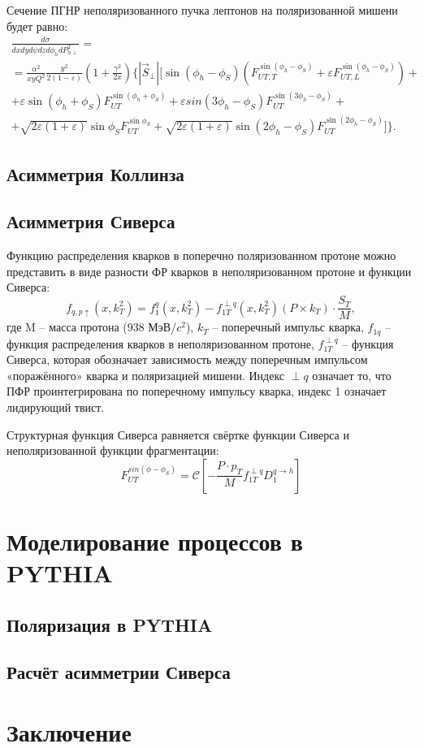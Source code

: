 \documentclass{extarticle}
\begin{document}
Сечение ПГНР неполяризованного пучка лептонов на поляризованной мишени будет равно:
\begin{multline}
	\frac{d\sigma}{dx dy d \psi dz d \phi_{h} dP^{2}_{h \perp}} = \\
	= \frac{\alpha^2}{xy Q^{2}} \frac{y^2}{2 (1 - \varepsilon)} \left(1 + \frac{\gamma^2}{2x} \right) \Biggl \lbrace 	
	 |\vec S_{\perp}| \Biggl[ \sin(\phi_h - \phi_S) \left(F_{U T, T}^{\sin(\phi_h - \phi_S)} +
	\varepsilon F_{UT, L}^{\sin(\phi_h - \phi_S)} \right) + \\
	+ \varepsilon \sin(\phi_h + \phi_S) F_{U T}^{\sin (\phi_h + \phi_S)} +
	\varepsilon sin (3\phi_h - \phi_S) F_{UT}^{\sin (3\phi_h - \phi_S)} + \\
	+ \sqrt{2 \varepsilon (1 + \varepsilon)} \sin \phi_S F_{UT}^{\sin \phi_S} +
	\sqrt{2 \varepsilon (1 + \varepsilon)} \sin(2\phi_h - \phi_S) F_{UT}^{\sin(2\phi_h - \phi_S)}  \Biggr]\Biggr \rbrace.
\end{multline}
\subsection{Асимметрия Коллинза}
\subsection{Асимметрия Сиверса}
Функцию распределения кварков в поперечно поляризованном протоне можно представить в виде разности ФР кварков в неполяризованном протоне и функции Сиверса:
\begin{equation}
	f_{q,p\uparrow} (x,k^2_T )=f_1^q (x,k^2_T )-f_{1T}^{\perp q} (x,k^2_T )(P\times k_T ) \cdot \frac{S_T}{M},
\end{equation}
где M – масса протона (938 МэВ/$c^2$), $k_T$ – поперечный импульс кварка, $f_{1q}$ – функция распределения кварков в неполяризованном протоне, $f_{1T}^{\perp q}$ – функция Сиверса, которая обозначает зависимость между поперечным импульсом «поражённого» кварка и поляризацией мишени. Индекс $\perp q$ означает то, что ПФР проинтегрирована по поперечному импульсу кварка, индекс 1 означает лидирующий твист.

Структурная функция Сиверса равняется свёртке функции Сиверса и неполяризованной функции фрагментации:
\begin{equation}
	F^{sin(\phi-\phi_S)}_{UT} = \mathcal{C}[-\frac{P\cdot p_T}{M}f_{1T}^{\perp q}D_1^{q \rightarrow h}]
\end{equation}


\newpage 
\section{Моделирование процессов в PYTHIA}
\subsection{Поляризация в PYTHIA}
\subsection{Расчёт асимметрии Сиверса}
\newpage
\section*{Заключение}
\newpage
\printbibliography
\end{document}
